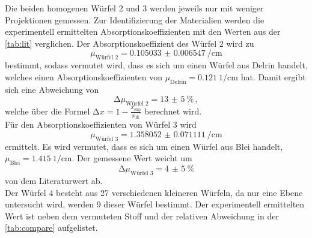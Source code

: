 \noindent Die beiden homogenen Würfel 2 und 3 werden jeweils nur mit weniger Projektionen gemessen. Zur Identifizierung der Materialien werden die 
experimentell ermittelten Absorptionskoeffizienten mit den Werten aus der \autoref{tab:lit} verglichen. Der Absorptionskoeffizient des Würfel 2 wird zu
\begin{equation*}
    \mu_{\text{Würfel 2}} = \SI{0.105033(6547)}{\per\centi\metre}
\end{equation*}
bestimmt, sodass vermutet wird, dass es sich um einen Würfel aus Delrin handelt, welches einen Absorptionskoeffizienten von $\mu_{\text{Delrin}} = 
\SI{0.121}{1\per\centi\metre}$ hat. Damit ergibt sich eine Abweichung von 
\begin{equation*}
    \increment \mu_{\text{Würfel 2}} = \SI{13(5)}{\percent}\, ,
\end{equation*}
welche über die Formel $\increment x = 1 - \frac{x_{\text{exp}}}{x_{\text{lit}}}$ berechnet wird. \\
Für den Absorptionskoeffizienten von Würfel 3 wird 
\begin{equation*}
    \mu_{\text{Würfel 3}} = \SI{1.358052(71111)}{\per\centi\metre}
\end{equation*}
ermittelt. Es wird vermutet, dass es sich um einen Würfel aus Blei handelt, $\mu_{\text{Blei}} = \SI{1.415}{1\per\centi\metre}$. Der gemessene Wert 
weicht um 
\begin{equation*}
    \increment \mu_{\text{Würfel 3}} = \SI{4(5)}{\percent}
\end{equation*}
von dem Literaturwert ab.\\
Der Würfel 4 besteht aus 27 verschiedenen kleineren Würfeln, da nur eine Ebene untersucht wird, werden 9 dieser Würfel bestimmt. Der experimentell ermittelten 
Wert ist neben dem vermuteten Stoff und der relativen Abweichung in der \autoref{tab:compare} aufgelistet. 

